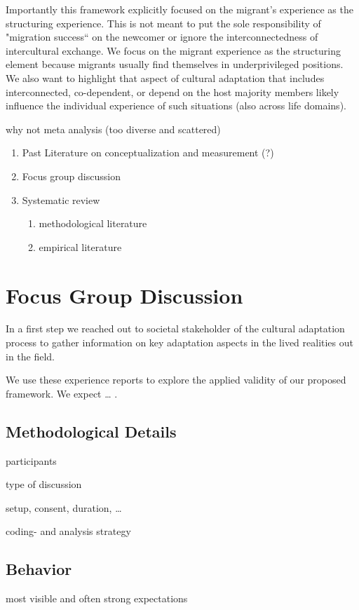 \documentclass[man, 12pt, a4paper]{apa7}
\begin{document}
Importantly this framework explicitly focused on the migrant's experience as the structuring experience. This is not meant to put the sole responsibility of "migration success“ on the newcomer or ignore the interconnectedness of intercultural exchange. We focus on the migrant experience as the structuring element because migrants usually find themselves in underprivileged positions. We also want to highlight that aspect of cultural adaptation that includes interconnected, co-dependent, or depend on the host majority members likely influence the individual experience of such situations (also across life domains).

why not meta analysis (too diverse and scattered)

\begin{enumerate}
  \item Past Literature on conceptualization and measurement (?)
  \item Focus group discussion
  \item Systematic review
   \begin{enumerate}
     \item methodological literature
     \item empirical literature
   \end{enumerate}
 \end{enumerate}

\section{Focus Group Discussion}
In a first step we reached out to societal stakeholder of the cultural adaptation process to gather information on key adaptation aspects in the lived realities out in the field.

We use these experience reports to explore the applied validity of our proposed framework. We expect … .
\subsection{Methodological Details}
participants

type of discussion

setup, consent, duration, …

coding- and analysis strategy

\subsection{Behavior}
most visible and often strong expectations
\end{document}
